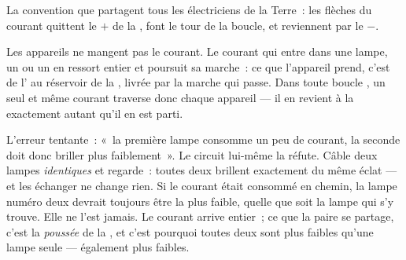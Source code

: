 \begin{omfigure}

{\small La convention que partagent tous les électriciens de la
Terre~: les flèches du courant quittent le $+$ de la , font le
tour de la boucle, et reviennent par le $-$.}
\end{omfigure}

\begin{proposition}\label{prop:g7:circuits-series-parallel:notconsumed}
Les appareils ne mangent pas le courant. Le courant qui entre dans
une lampe, un  ou un  en ressort entier et poursuit sa
marche~: ce que l'appareil prend, c'est de l'\emph{} au
réservoir de la , livrée par la marche qui passe. Dans toute
boucle , un seul et même courant traverse donc chaque
appareil --- il en revient à la  exactement autant qu'il en est
parti.
\end{proposition}

\begin{example}\label{ex:g7:circuits-series-parallel:trial}
L'erreur tentante~: «~la première lampe consomme un peu de courant,
la seconde doit donc briller plus faiblement~». Le circuit lui-même
la réfute. Câble deux lampes \emph{identiques}  et
regarde~: toutes deux brillent exactement du même éclat --- et les
échanger ne change rien. Si le courant était consommé en chemin, la
lampe numéro deux devrait toujours être la plus faible, quelle que
soit la lampe qui s'y trouve. Elle ne l'est jamais. Le courant arrive
entier~; ce que la paire se partage, c'est la \emph{poussée} de la
, et c'est pourquoi toutes deux sont plus faibles qu'une lampe
seule --- également plus faibles.
\end{example}

